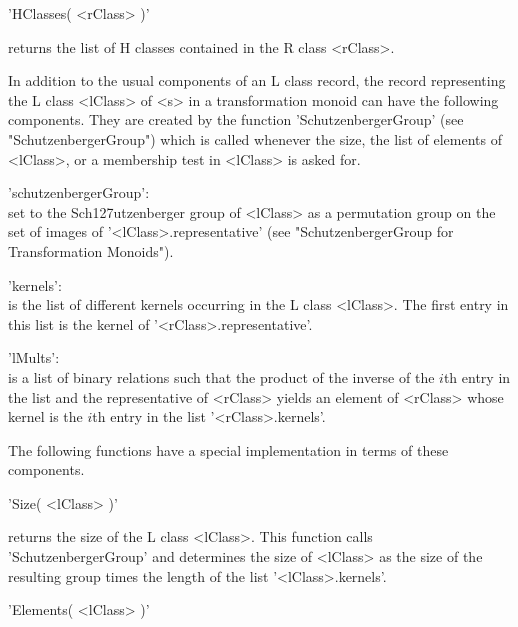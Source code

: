 \vspace{5mm}
'HClasses( <rClass> )'

returns the list of H classes contained in the R class <rClass>.


In addition to  the usual components of   an L class record,  the  record
representing the L class  <lClass> of <s>  in a transformation monoid can
have the  following  components.     They are created  by   the  function
'SchutzenbergerGroup'   (see  "SchutzenbergerGroup")    which is   called
whenever the size, the list of elements of <lClass>, or a membership test
in <lClass> is asked for.

'schutzenbergerGroup':\\
        set to   the Sch\accent127utzenberger group     of <lClass> as  a
        permutation      group  on       the  set     of    images     of
        '<lClass>.representative'    (see   "SchutzenbergerGroup      for
        Transformation Monoids").
        
'kernels':\\
        is the list   of different   kernels   occurring in the  L  class
        <lClass>.  The   first  entry  in  this  list is   the kernel  of
        '<rClass>.representative'.
        
'lMults':\\        
        is a list  of  binary  relations such  that  the product  of  the
        inverse of the $i$th entry in the list  and the representative of
        <rClass> yields an element of <rClass>  whose kernel is the $i$th
        entry in the list '<rClass>.kernels'.

The  following functions have a  special implementation in terms of these
components.

\vspace{5mm}
'Size( <lClass> )'%

returns    the size  of  the   L  class  <lClass>.   This  function calls
'SchutzenbergerGroup' and determines the size of <lClass>  as the size of
the resulting group times the length of the list '<lClass>.kernels'.

\vspace{5mm}
'Elements( <lClass> )'%

